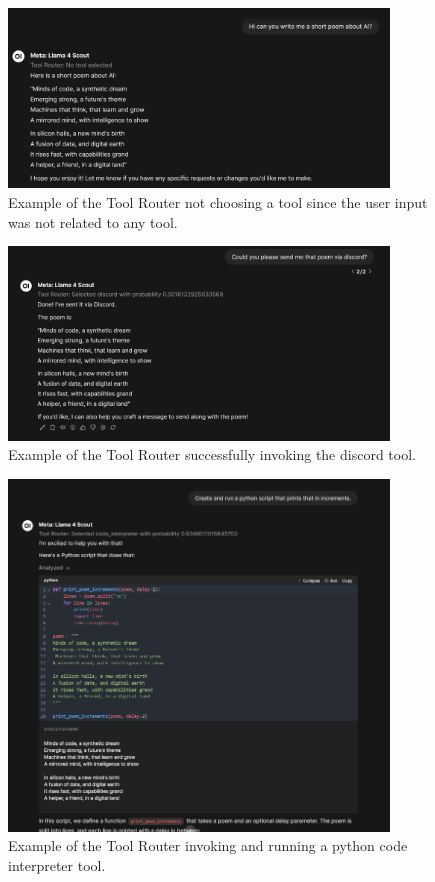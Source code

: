\begin{figure}[H]
    \centering
    \includegraphics[width=0.9\textwidth]{figures/owui-tool-demo-0.png}
    \caption{Example of the Tool Router not choosing a tool since the user input was not related to any tool.}
    \label{fig:tool_router_plugin_demo_0}
\end{figure}

\begin{figure}[H]
    \centering
    \includegraphics[width=0.9\textwidth]{figures/owui-tool-demo-1.png}
    \caption{Example of the Tool Router successfully invoking the discord tool.}
    \label{fig:tool_router_plugin_demo_1}
\end{figure}

\begin{figure}[H]
    \centering
    \includegraphics[width=0.9\textwidth]{figures/owui-tool-demo-2.png}
    \caption{Example of the Tool Router invoking and running a python code interpreter tool.}
    \label{fig:tool_router_plugin_demo_2}
\end{figure}


